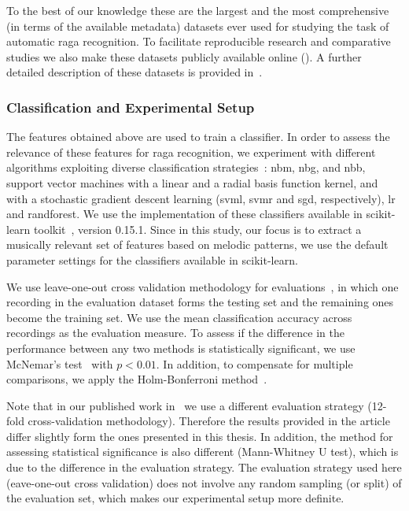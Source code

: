 To the best of our knowledge these are the largest and the most comprehensive (in terms of the available metadata) datasets ever used for studying the task of automatic \gls{raga} recognition. To facilitate reproducible research and comparative studies we also make these datasets publicly available online (). A further detailed description of these datasets is provided in~. 

\subsubsection{Classification and Experimental Setup}
\label{sec:raga_rec_pattern_classification_evaluation}

The features obtained above are used to train a classifier. In order to assess the relevance of these features for \gls{raga} recognition, we experiment with different algorithms exploiting diverse classification strategies~\citep{Hastie09BOOK}: \acrfull{nbm}, \acrfull{nbg}, and \acrfull{nbb}, support vector machines with a linear and a radial basis function kernel, and with a stochastic gradient descent learning (\acrshort{svml}, \acrshort{svmr} and \acrshort{sgd}, respectively), \acrfull{lr} and \acrfull{randforest}. We use the implementation of these classifiers available in scikit-learn toolkit~\citep{scikitlearn}, version 0.15.1. Since in this study, our focus is to extract a musically relevant set of features based on melodic patterns, we use the  default parameter settings for the classifiers available in scikit-learn. 

We use leave-one-out cross validation methodology for evaluations~\citep{Mitchell97BOOK}, in which one recording in the evaluation dataset forms the testing set and the remaining ones become the training set. We use the mean classification accuracy across recordings as the evaluation measure. To assess if the difference in the performance between any two methods is statistically significant, we use McNemar's test~\citep{mcnemar1947note} with $p < 0.01$. In addition, to compensate for multiple comparisons, we apply the Holm-Bonferroni method~\citep{holm1979simple}. 

Note that in our published work in~\cite{gulatiphrase_2016} we use a different evaluation strategy (12-fold cross-validation methodology). Therefore the results provided in the article differ slightly form the ones presented in this thesis. In addition, the method for assessing statistical significance is also different (Mann-Whitney U test), which is due to the difference in the evaluation strategy. The evaluation strategy used here (eave-one-out cross validation) does not involve any random sampling (or split) of the evaluation set, which makes our experimental setup more definite.


